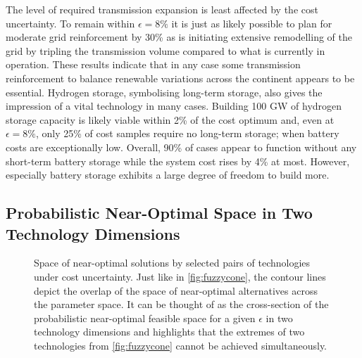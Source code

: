 The level of required transmission expansion is least affected by the cost uncertainty.
To remain within $\epsilon=8\%$ it is just as likely possible to
plan for moderate grid reinforcement by 30\% as
is initiating extensive remodelling of the grid by tripling the transmission volume
compared to what is currently in operation.
These results indicate that in any case some transmission reinforcement
to balance renewable variations across the continent appears to be essential.
Hydrogen storage, symbolising long-term storage, also gives the impression of a vital technology in many cases.
Building 100 GW of hydrogen storage capacity is likely viable within 2\% of the cost optimum
and, even at $\epsilon=8\%$, only 25\% of cost samples require no long-term storage;
when battery costs are exceptionally low.
Overall, 90\% of cases appear to function without any short-term battery storage
while the system cost rises by 4\% at most.
However, especially battery storage exhibits a large degree of freedom to build more.

\subsection{Probabilistic Near-Optimal Space in Two Technology Dimensions}

\begin{figure}
    \noindent{}
    \caption{
      Space of near-optimal solutions by selected pairs of technologies under cost uncertainty.
    Just like in \cref{fig:fuzzycone}, the contour lines depict the overlap of the space of near-optimal alternatives across the parameter space.
    It can be thought of as the cross-section of the probabilistic near-optimal feasible space for a given $\epsilon$
    in two technology dimensions and highlights that the extremes of two technologies from \cref{fig:fuzzycone} cannot be achieved simultaneously.
    }
    \label{fig:dependencies}
\end{figure}

